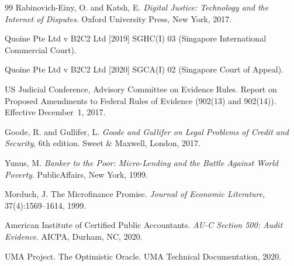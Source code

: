 \documentclass[11pt,a4paper]{article}
\theoremstyle{remark}
\begin{document}
\begin{thebibliography}{99}
Rabinovich-Einy, O. and Katsh, E.
\newblock \emph{Digital Justice: Technology and the Internet of
  Disputes}.
\newblock Oxford University Press, New York, 2017.

Quoine Pte Ltd v B2C2 Ltd [2019] SGHC(I) 03 (Singapore
International Commercial Court).

Quoine Pte Ltd v B2C2 Ltd [2020] SGCA(I) 02 (Singapore Court of
Appeal).

US Judicial Conference, Advisory Committee on Evidence Rules.
\newblock Report on Proposed Amendments to Federal Rules of Evidence
  (902(13) and 902(14)).
\newblock Effective December~1, 2017.

Goode, R. and Gullifer, L.
\newblock \emph{Goode and Gullifer on Legal Problems of Credit and
  Security}, 6th edition.
\newblock Sweet \& Maxwell, London, 2017.

Yunus, M.
\newblock \emph{Banker to the Poor: Micro-Lending and the Battle
  Against World Poverty}.
\newblock PublicAffairs, New York, 1999.

Morduch, J.
\newblock The Microfinance Promise.
\newblock \emph{Journal of Economic Literature},
  37(4):1569--1614, 1999.

American Institute of Certified Public Accountants.
\newblock \emph{AU-C Section 500: Audit Evidence}.
\newblock AICPA, Durham, NC, 2020.

UMA Project.
\newblock The Optimistic Oracle.
\newblock UMA Technical Documentation, 2020.

\end{thebibliography}
\end{document}
